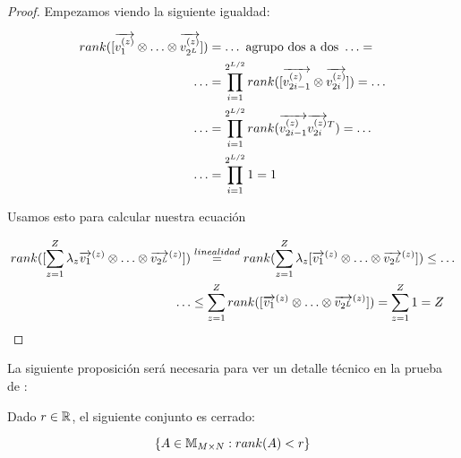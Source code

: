 \begin{proof}

    Empezamos viendo la siguiente igualdad:

    \begin{equation}
        \begin{split}
            rank([\nv{v_1^{(z)}}  \otimes \ldots \otimes \nv{v_{2^L}^{(z)}}]) &= \ldots \text{  agrupo dos a dos   } \ldots = \\
            \ldots &= \prod_{i = 1}^{2^{L/2}} rank([\nv{v_{2i - 1}^{(z)}} \otimes\nv{v_{2i}^{(z)}}]) = \ldots   \\
            \ldots &= \prod_{i = 1}^{2^{L/2}} rank(\nv{v_{2i - 1}^{(z)}} \nv{v_{2i}^{(z)}}^T) = \ldots \\
            \ldots &= \prod_{i = 1}^{2^{L/2}} 1 = 1
        \end{split}
    \end{equation}

    Usamos esto para calcular nuestra ecuación

    \begin{equation}
        \begin{split}
            rank([\sum_{z = 1}^Z \lambda_z \nv{v_1}^{(z)} \otimes \ldots \otimes \nv{v_{2^L}}^{(z)}]) &\encima{=}{linealidad} rank(\sum_{z = 1}^Z \lambda_z [\nv{v_1}^{(z)} \otimes \ldots \otimes \nv{v_{2^L}}^{(z)}]) \leq \ldots \\
            \ldots &\leq \sum_{z = 1}^Z rank([\nv{v_1}^{(z)} \otimes \ldots \otimes \nv{v_{2^L}}^{(z)}]) = \sum_{z = 1}^Z 1 = Z
        \end{split}
    \end{equation}
\end{proof}

La siguiente proposición será necesaria para ver un detalle técnico en la prueba de :

\begin{proposicion}
    Dado $r \in \R$, el siguiente conjunto es cerrado:

    \begin{equation}
        \conjunto{A \in \espaciomatrices{M}{N}: rank(A) < r }
    \end{equation}
\end{proposicion}

